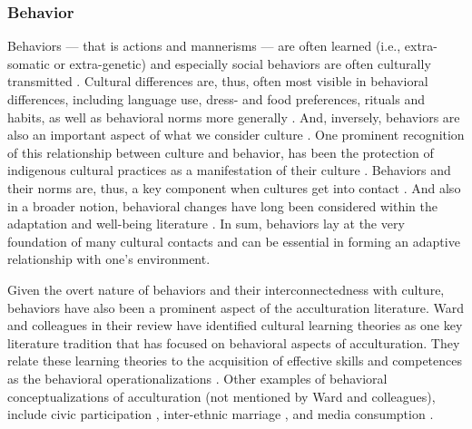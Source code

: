 \documentclass[man, 12pt, a4paper]{apa7}
\begin{document}
\subsubsection{Behavior}
Behaviors --- that is actions and mannerisms --- are often learned (i.e., extra-somatic or extra-genetic) and especially social behaviors are often culturally transmitted \citep{Legare2019, Whiting1980}. Cultural differences are, thus, often most visible in behavioral differences, including language use, dress- and food preferences, rituals and habits, as well as behavioral norms more generally \citep[e.g., social norms, as well as formal rules and laws; e.g.,][]{Hofstede2001}. And, inversely, behaviors are also an important aspect of what we consider culture \citep[e.g.,][]{Varnum2017}. One prominent recognition of this relationship between culture and behavior, has been the protection of indigenous cultural practices as a manifestation of their culture \citep[Art. 11]{UnitedNations2007}. Behaviors and their norms are, thus, a key component when cultures get into contact \citep[also see][]{Maxwell2017, Sam2010}. And also in a broader notion, behavioral changes have long been considered within the adaptation and well-being literature \citep[e.g.,][]{Luhmann2012}. In sum, behaviors lay at the very foundation of many cultural contacts and can be essential in forming an adaptive relationship with one's environment.

Given the overt nature of behaviors and their interconnectedness with culture, behaviors have also been a prominent aspect of the acculturation literature. Ward and colleagues \citeyear{Ward2019} in their review have identified cultural learning theories as one key literature tradition that has focused on behavioral aspects of acculturation. They relate these learning theories to the acquisition of effective skills and competences as the behavioral operationalizations \citep[including, verbal and non-verbal communication skills][]{Ward2001}. Other examples of behavioral conceptualizations of acculturation (not mentioned by Ward and colleagues), include civic participation \citep[e.g., voting;][]{Lessard-Phillips2020}, inter-ethnic marriage \citep[e.g.,][]{Song2009}, and media consumption \citep[e.g.,][]{Shoemaker1985}. 
\end{document}
